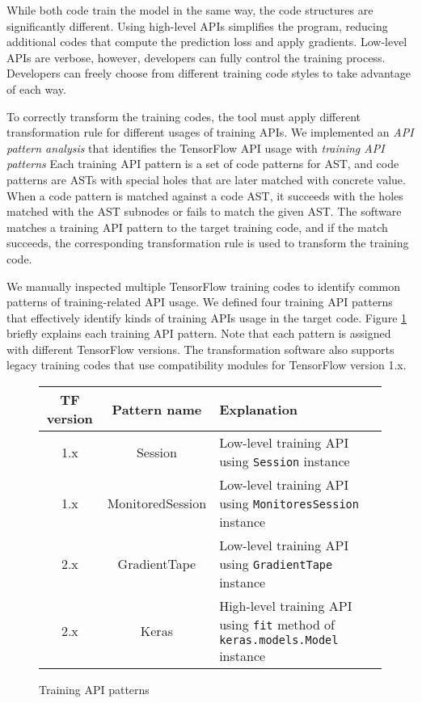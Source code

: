 While both code train the model in the same way, 
the code structures are significantly different.
Using high-level APIs simplifies the program,
reducing additional codes that compute the prediction loss and apply gradients.
Low-level APIs are verbose, however, developers can fully control
the training process.
Developers can freely choose from different training code styles to
take advantage of each way.

To correctly transform the training codes, 
the tool must apply different transformation rule for different usages
of training APIs.
We implemented an \textit{API pattern analysis} that identifies
the TensorFlow API usage with \textit{training API patterns} 
Each training API pattern is a set of code patterns for AST,
and code patterns are ASTs with
special holes that are later matched with concrete value.
When a code pattern is matched against a code AST,
it succeeds with the holes matched with the AST subnodes
or fails to match the given AST.
The software matches a training API pattern to the target training code,
and if the match succeeds, the corresponding transformation rule
is used to transform the training code.

We manually inspected multiple TensorFlow training codes to identify
common patterns of training-related API usage. 
We defined four training API patterns
that effectively identify kinds of training APIs usage in the target code.
Figure \ref{tab:patterns} briefly explains each training API pattern.
Note that each pattern is assigned with different TensorFlow versions.
The transformation software also supports legacy training codes
that use compatibility modules for TensorFlow version 1.x.

\begin{figure}
  \centering
  \begin{tabular}{|c|c|l|}
    \hline
    TF version & Pattern name & Explanation \\
    \hline
    1.x & Session & Low-level training API using {\tt Session} instance\\
    \hline
    1.x & MonitoredSession & Low-level training API using {\tt MonitoresSession} instance \\
    \hline
    2.x & GradientTape & Low-level training API using {\tt GradientTape} instance\\
    \hline
    2.x & Keras & High-level training API using {\tt fit} method of {\tt keras.models.Model} instance\\
    \hline
  \end{tabular}
  \caption{Training API patterns}
  \label{tab:patterns}
\end{figure}

